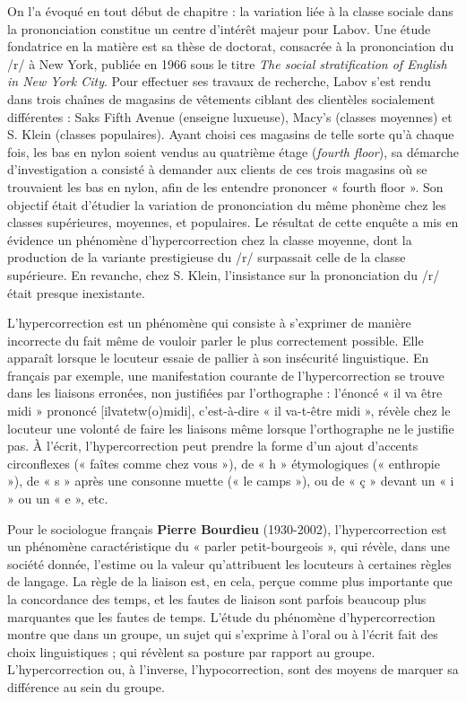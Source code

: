 On l’a évoqué en tout début de chapitre : la variation liée à la classe sociale dans la prononciation constitue un centre d’intérêt majeur pour Labov. Une étude fondatrice en la matière est sa thèse de
doctorat, consacrée à la prononciation du /r/ à New York, publiée en 1966 sous le titre \textit{The social stratification of English in New York City}. Pour effectuer ses travaux de recherche, Labov s’est rendu dans trois chaînes de magasins de vêtements ciblant des clientèles socialement différentes : Saks Fifth Avenue (enseigne luxueuse), Macy’s (classes moyennes) et S. Klein (classes populaires). Ayant choisi ces magasins de telle sorte qu’à chaque fois, les bas en nylon soient vendus au quatrième étage (\textit{fourth floor}), sa démarche d’investigation a consisté à demander aux clients de ces trois magasins où se trouvaient les bas en nylon, afin de les entendre prononcer « fourth floor ». Son objectif était d’étudier la variation de prononciation du même phonème chez les classes supérieures, moyennes, et populaires. Le résultat de cette enquête a mis en évidence un phénomène d’hypercorrection chez la classe moyenne, dont la production de la variante prestigieuse du /r/ surpassait celle de la classe supérieure. En revanche, chez S. Klein, l’insistance sur la prononciation du /r/ était presque inexistante.

L’hypercorrection est un phénomène qui consiste à s’exprimer de manière incorrecte du fait même de vouloir parler le plus correctement possible. Elle apparaît lorsque le locuteur essaie de pallier à son insécurité linguistique. En français par exemple, une manifestation courante de l’hypercorrection se trouve dans les liaisons erronées, non justifiées par l’orthographe : l’énoncé « il va être midi » prononcé [ilvatetw(o)midi], c’est-à-dire « il va-t-être midi », révèle chez le locuteur une volonté de faire les liaisons même lorsque l’orthographe ne le justifie pas. À l’écrit, l’hypercorrection peut prendre la forme d’un ajout d’accents circonflexes (« faîtes comme chez vous »), de « h » étymologiques (« enthropie »), de « s » après une consonne muette (« le camps »), ou de « ç » devant un « i » ou un « e », etc.

Pour le sociologue français \textbf{Pierre Bourdieu} (1930-2002), l’hypercorrection est un phénomène caractéristique du « parler petit-bourgeois », qui révèle, dans une société donnée, l’estime ou la valeur qu’attribuent les locuteurs à certaines règles de langage. La règle de la liaison est, en cela, perçue comme plus importante que la concordance des temps, et les fautes de liaison sont parfois beaucoup plus marquantes que les fautes de temps. L’étude du phénomène d’hypercorrection montre que dans un groupe, un sujet qui s’exprime à l’oral ou à l’écrit fait des choix linguistiques ; qui révèlent sa posture par rapport au groupe. L’hypercorrection ou, à l’inverse, l’hypocorrection, sont des moyens de marquer sa différence au sein du groupe.

